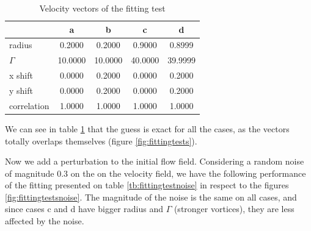 \documentclass[12pt, a4paper, openany]{memoir}
\begin{document}
\begin{table}[h]
	\centering
	\caption{Velocity vectors of the fitting test}
	\vspace{10px}
	\label{tb:fittingtest}
	\begin{tabular}{l|c|c|c|c}
		            & a      & b & c & d \\
		\hline
		radius      & 0.2000   & 0.2000 & 0.9000 & 0.8999  \\
		$\Gamma$       & 10.0000 & 10.0000 & 40.0000 & 39.9999 \\
		x shift     & 0.0000  & 0.2000 & 0.0000 & 0.2000 \\
		y shift     & 0.0000  & 0.2000 & 0.0000 & 0.2000 \\ 
		correlation & 1.0000   & 1.0000 & 1.0000 & 1.0000 \\
	\end{tabular}
\end{table}

We can see in table \ref{tb:fittingtest} that the guess is exact for all the cases, as the vectors totally overlaps themselves (figure \ref{fig:fittingtests}).

Now we add a perturbation to the initial flow field. Considering a random noise of magnitude 0.3 on the on the velocity field, we have the following performance of the fitting presented on table \ref{tb:fittingtestnoise} in respect to the figures \ref{fig:fittingtestsnoise}. The magnitude of the noise is the same on all cases, and since cases c and d have bigger radius and $\Gamma$ (stronger vortices), they are less affected by the noise.
\end{document}
